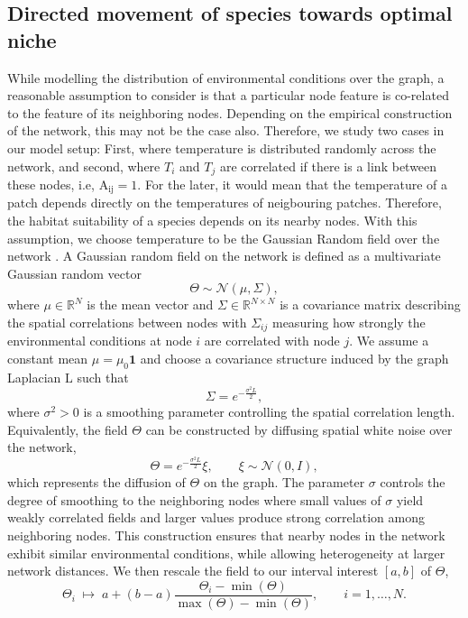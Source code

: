 \documentclass[12pt]{article}
\begin{document}
\subsection{Directed movement of species towards optimal niche} \label{Sec:optimal_niche_prediction}
While modelling the distribution of environmental conditions over the graph, a reasonable assumption to consider is that a particular node feature is co-related to the feature of its neighboring nodes. Depending on the empirical construction of the network, this may not be the case also. Therefore, we study two cases in our model setup: First, where temperature is distributed randomly across the network, and second, where $T_i$ and $T_j$ are correlated if there is a link between these nodes, i.e, $\mathrm{A_{ij}}=1.$ For the later, it would mean that the temperature of a patch depends directly on the temperatures of neigbouring patches. Therefore, the habitat suitability of a species depends on its nearby nodes. With this assumption, we choose temperature to be the Gaussian Random field over the network \cite{rue2005gaussian}. A Gaussian random field on the network is defined as a multivariate Gaussian random vector
\[
\Theta \sim \mathcal{N}(\mu,\Sigma),
\]
where $\mu \in \mathbb{R}^N$ is the mean vector and $\Sigma \in \mathbb{R}^{N \times N}$ is a covariance matrix describing the spatial correlations between nodes with $\Sigma_{ij}$ measuring how strongly the environmental conditions at node $i$ are correlated with node $j.$ We assume a constant mean $\mu=\mu_0 \mathbf{1}$ and choose a covariance structure induced by the graph Laplacian $\mathrm{L}$ such that
\[
\Sigma = e^{-\tfrac{\sigma^2L}{2} },
\]
where $\sigma^2>0$ is a smoothing parameter controlling the spatial correlation length. Equivalently, the field $\Theta$ can be constructed by diffusing spatial white noise over the network,
\[
\Theta =e^{-\tfrac{\sigma^2L}{2} }\xi,
\qquad
\xi \sim \mathcal{N}(0,I),
\]
which represents the diffusion of $\Theta$ on the graph. The parameter $\sigma$ controls the degree of smoothing to the neighboring nodes where small values of $\sigma$ yield weakly correlated fields and larger values produce strong correlation among neighboring nodes. This construction ensures that nearby nodes in the network exhibit similar environmental conditions, while allowing heterogeneity at larger network distances. We then rescale the field to our interval interest $[a,b]$ of $\Theta$,
\[
\Theta_i \;\mapsto\; a + (b-a)\frac{\Theta_i-\min(\Theta)}{\max(\Theta)-\min(\Theta)}, \qquad i=1,\dots,N.
\]
\end{document}
